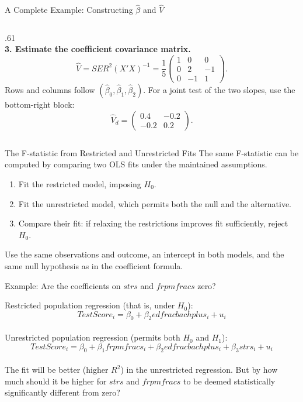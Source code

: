 \documentclass[notes,10pt, aspectratio=169]{beamer}
\begin{document}
\begin{frame}{A Complete Example: Constructing $\hat\beta$ and $\widehat V$}
\begin{columns}[T]
\begin{column}{.61\textwidth}
\[\]
\textbf{3. Estimate the coefficient covariance matrix.}
\[
\widehat V=SER^2(X'X)^{-1}
=\frac15\begin{pmatrix}1&0&0\\0&2&-1\\0&-1&1\end{pmatrix}.
\]
Rows and columns follow $(\hat\beta_0,\hat\beta_1,\hat\beta_2)$.
For a joint test of the two slopes, use the bottom-right block:
\[
\widehat V_d=\begin{pmatrix}0.4&-0.2\\-0.2&0.2\end{pmatrix}.
\]
\end{column}
\end{columns}
\end{frame}

\begin{frame}{The F-statistic from Restricted and Unrestricted Fits}
The same F-statistic can be computed by comparing two OLS fits under the maintained assumptions.\\[1em]
\begin{enumerate}
\item Fit the restricted model, imposing $H_0$.\\[1em]
\item Fit the unrestricted model, which permits both the null and the alternative.\\[1em]
\item Compare their fit: if relaxing the restrictions improves fit sufficiently, reject $H_0$.
\end{enumerate}
\vspace{1em}
Use the same observations and outcome, an intercept in both models, and the same null hypothesis as in the coefficient formula.
\end{frame}

\begin{frame}{Example: Are the coefficients on $strs$ and $frpmfracs$ zero?}


Restricted population regression (that is, under $H_0$):
\begin{equation*}
    TestScore_i = \beta_0 + \beta_2 edfracbachplus_i + u_i
\end{equation*}
\\[1em]
Unrestricted population regression (permits both $H_0$ and $H_1$):
\begin{equation*}
    TestScore_i = \beta_0 + \beta_1 frpmfracs_i + \beta_2 edfracbachplus_i + \beta_3 strs_i + u_i
\end{equation*}
\\[1em]
The fit will be better (higher $R^2$) in the unrestricted regression. But by how much should it be higher for $strs$ and $frpmfracs$ to be deemed statistically significantly different from zero?
\end{frame}
\end{document}
